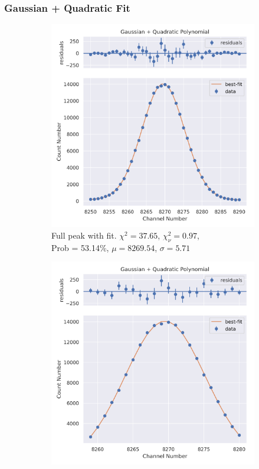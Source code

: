 \documentclass[11pt,a4paper]{article}
\begin{document}
\subsubsection{Gaussian + Quadratic Fit}
\begin{figure}[H]
  \centering
  \begin{subfigure}{.5\linewidth}
    \centering
    \includegraphics[width=\linewidth]{./Images/Cobalt60/Quad/Quad_1_Full.png}
    \caption{Full peak with fit. $\chi^2 = 37.65$, $\chi^2_\nu = 0.97$, \\ Prob = 53.14\%, $\mu = 8269.54$, $\sigma = 5.71$}
  \end{subfigure}%
  \begin{subfigure}{.5\linewidth}
    \centering
    \includegraphics[width=\linewidth]{./Images/Cobalt60/Quad/Quad_1_Zoom.png}

\end{subfigure}
\end{figure}
\end{document}
